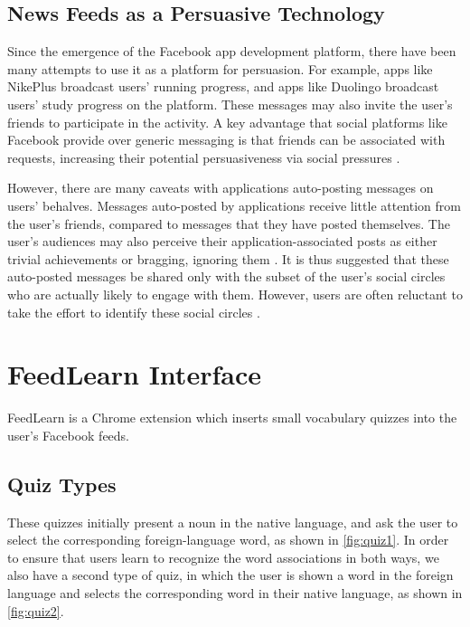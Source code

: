\documentclass{chi-ext}
\begin{document}
\subsection{News Feeds as a Persuasive Technology}

Since the emergence of the Facebook app development platform, there have been
many attempts to use it as a platform for persuasion. For example, apps like NikePlus broadcast users' running progress, and apps like Duolingo broadcast users' study progress on the platform. These messages may also invite the user's friends to participate in the activity. A key advantage that social platforms like Facebook provide over generic messaging is that friends can be associated with requests, increasing their potential persuasiveness via social pressures \cite{foggfacebook}.

However, there are many caveats with applications auto-posting messages on users' behalves. Messages auto-posted by applications receive little attention from the user's friends, compared to messages that they have posted themselves. The user's audiences may also perceive their application-associated posts as either trivial achievements or bragging, ignoring them \cite{socialsharing}. It is thus suggested that these auto-posted messages be shared only with the subset of the user's social circles who are actually likely to engage with them. However, users are often reluctant to take the effort to identify these social circles \cite{socialsharing}.


\section{FeedLearn Interface}

FeedLearn is a Chrome extension which inserts small vocabulary quizzes into the user's Facebook feeds.

\subsection{Quiz Types}

These quizzes initially present a noun in the native language, and ask the user to select the corresponding foreign-language word, as shown in \autoref{fig:quiz1}. In order to ensure that users learn to recognize the word associations in both ways, we also have a second type of quiz, in which the user is shown a word in the foreign language and selects the corresponding word in their native language, as shown in \autoref{fig:quiz2}.
\end{document}
